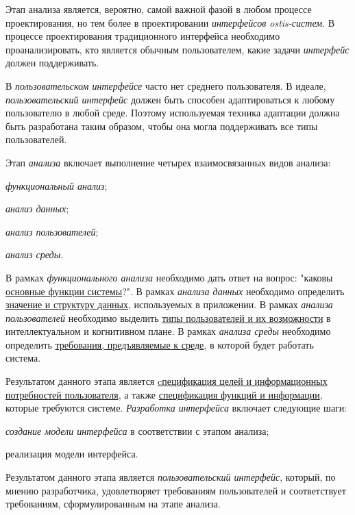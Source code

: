 Этап анализа является, вероятно, самой важной фазой в любом процессе проектирования, но тем более в проектировании \textit{интерфейсов ostis-систем}. В
процессе проектирования традиционного интерфейса
необходимо проанализировать, кто является обычным пользователем, какие задачи \textit{интерфейс} должен поддерживать. 

В \textit{пользовательском интерфейсе} часто нет среднего пользователя.
В идеале, \textit{пользовательский интерфейс} должен быть способен адаптироваться к любому пользователю в любой среде. Поэтому используемая техника адаптации должна быть разработана таким образом, чтобы она могла поддерживать все типы пользователей.

Этап \textit{анализа} включает выполнение четырех взаимосвязанных видов анализа:
\begin{textitemize}
    \item \textit{функциональный анализ};
    \item \textit{анализ данных};
    \item \textit{анализ пользователей};
    \item \textit{анализ среды}.
\end{textitemize}

В рамках \textit{функционального анализа} необходимо дать ответ на вопрос: "каковы \uline{основные функции системы}?".
В рамках \textit{анализа данных} необходимо определить \uline{значение и структуру данных}, используемых в приложении.
В рамках \textit{анализа пользователей} необходимо выделить \uline{типы пользователей и их возможности} в интеллектуальном
и когнитивном плане.
В рамках \textit{анализа среды} необходимо определить \uline{требования, предъявляемые к среде}, в которой будет работать система.

Результатом данного этапа является \uline{cпецификация целей и информационных потребностей пользователя}, а также
\uline{спецификация функций и информации}, которые требуются системе.
\textit{Разработка интерфейса} включает следующие шаги:
\begin{textitemize}
	\item \textit{создание модели интерфейса} в соответствии с этапом анализа;
	\item реализация модели интерфейса.
\end{textitemize}

Результатом данного этапа является \textit{пользовательский интерфейс}, который, по мнению разработчика, удовлетворяет требованиям пользователей и соответствует требованиям, сформулированным на этапе анализа.

